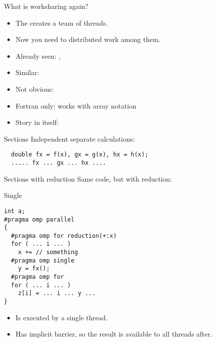 
\begin{numberedframe}{What is worksharing again?}
  \begin{itemize}
  \item The  creates a team of threads.
  \item Now you need to distributed work among them.
  \item Already seen: , 
  \item Similar: 
  \item Not obvious: 
  \item Fortran only:  works with array notation
  \item Story in itself: 
  \end{itemize}
\end{numberedframe}

\begin{numberedframe}{Sections}
Independent separate calculations:
\begin{lstlisting}
  double fx = f(x), gx = g(x), hx = h(x);
  ..... fx ... gx ... hx ....
\end{lstlisting}
\end{numberedframe}

\begin{numberedframe}{Sections with reduction}
Same code, but with reduction:
\end{numberedframe}

\begin{numberedframe}{Single}
\begin{lstlisting}
int a;
#pragma omp parallel
{
  #pragma omp for reduction(+:x)
  for ( ... i ... )
    x += // something
  #pragma omp single
    y = fx();
  #pragma omp for
  for ( ... i ... )
    z[i] = ... i ... y ...
}
\end{lstlisting}
  \begin{itemize}
  \item Is executed by a single thread.
  \item Has implicit barrier, so the result is available to all threads
    after.
  \end{itemize}
\end{numberedframe}

